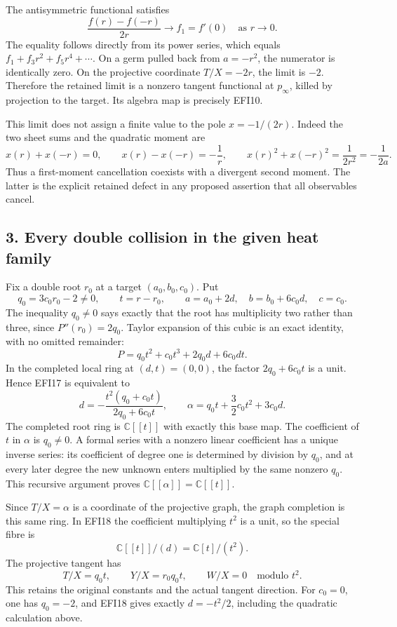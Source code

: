 \documentclass[
  10pt,
  a4paper,
]{article}
\begin{document}
The antisymmetric functional satisfies \[
\frac{f(r)-f(-r)}{2r}\longrightarrow f_1=f'(0)
\quad\text{as }r\longrightarrow0.
\tag{EFI14}
\] The equality follows directly from its power series, which equals
\(f_1+f_3r^2+f_5r^4+\cdots\). On a germ pulled back from \(a=-r^2\), the
numerator is identically zero. On the projective coordinate \(T/X=-2r\),
the limit is \(-2\). Therefore the retained limit is a nonzero tangent
functional at \(p_\infty\), killed by projection to the target. Its
algebra map is precisely EFI10.

This limit does not assign a finite value to the pole \(x=-1/(2r)\).
Indeed the two sheet sums and the quadratic moment are \[
x(r)+x(-r)=0,
\qquad x(r)-x(-r)=-\frac1r,
\qquad x(r)^2+x(-r)^2=\frac1{2r^2}=-\frac1{2a}.
\tag{EFI15}
\] Thus a first-moment cancellation coexists with a divergent second
moment. The latter is the explicit retained defect in any proposed
assertion that all observables cancel.

\subsection{3. Every double collision in the given heat
family}\label{every-double-collision-in-the-given-heat-family}

Fix a double root \(r_0\) at a target \((a_0,b_0,c_0)\). Put \[
q_0=3c_0r_0-2\ne0,\qquad t=r-r_0,
\qquad a=a_0+2d,\quad b=b_0+6c_0d,\quad c=c_0.
\tag{EFI16}
\] The inequality \(q_0\ne0\) says exactly that the root has
multiplicity two rather than three, since \(P''(r_0)=2q_0\). Taylor
expansion of this cubic is an exact identity, with no omitted remainder:
\[
P=q_0t^2+c_0t^3+2q_0d+6c_0dt.
\tag{EFI17}
\] In the completed local ring at \((d,t)=(0,0)\), the factor
\(2q_0+6c_0t\) is a unit. Hence EFI17 is equivalent to \[
d=-\frac{t^2(q_0+c_0t)}{2q_0+6c_0t},
\qquad
\alpha=q_0t+\frac32c_0t^2+3c_0d.
\tag{EFI18}
\] The completed root ring is \(\mathbb C[[t]]\) with exactly this base
map. The coefficient of \(t\) in \(\alpha\) is \(q_0\ne0\). A formal
series with a nonzero linear coefficient has a unique inverse series:
its coefficient of degree one is determined by division by \(q_0\), and
at every later degree the new unknown enters multiplied by the same
nonzero \(q_0\). This recursive argument proves
\(\mathbb C[[\alpha]]=\mathbb C[[t]]\).

Since \(T/X=\alpha\) is a coordinate of the projective graph, the graph
completion is this same ring. In EFI18 the coefficient multiplying
\(t^2\) is a unit, so the special fibre is \[
\mathbb C[[t]]/(d)=\mathbb C[t]/(t^2).
\tag{EFI19}
\] The projective tangent has \[
T/X=q_0t,\qquad Y/X=r_0q_0t,\qquad W/X=0
\quad\text{modulo }t^2.
\tag{EFI20}
\] This retains the original constants and the actual tangent direction.
For \(c_0=0\), one has \(q_0=-2\), and EFI18 gives exactly \(d=-t^2/2\),
including the quadratic calculation above.
\end{document}
